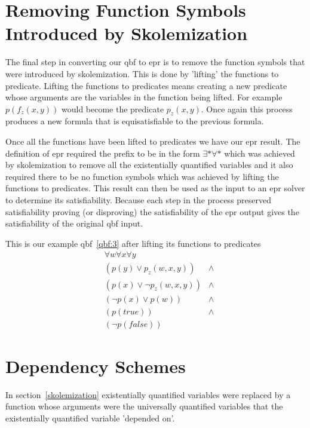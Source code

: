 \section{Removing Function Symbols Introduced by Skolemization}
The final step in converting our \gls{qbf} to \gls{epr} is to remove the function symbols that were introduced by skolemization. This is done by 'lifting' the functions to predicate. Lifting the functions to predicates means creating a new predicate whose arguments are the variables in the function being lifted. For example $p(f_z(x, y))$ would become the predicate $p_z(x, y)$. Once again this process produces a new formula that is equisatisfiable to the previous formula.

Once all the functions have been lifted to predicates we have our \gls{epr} result. The definition of \gls{epr} required the prefix to be in the form $\exists * \forall *$ which was achieved by skolemization to remove all the existentially quantified variables and it also required there to be no function symbols which was achieved by lifting the functions to predicates. This result can then be used as the input to an \gls{epr} solver to determine its satisfiability. Because each step in the process preserved satisfiability proving (or disproving) the satisfiability of the \gls{epr} output gives the satisfiability of the original \gls{qbf} input.

This is our example \gls{qbf}~\ref{qbf:3} after lifting its functions to predicates
\begin{equation} \label{qbf:3}
\begin{aligned}
&\forall w \forall x \forall y\\
&(p(y) \lor p_z(w, x, y)) &\land\\
&(p(x) \lor \neg p_z(w, x, y)) &\land\\
&(\neg p(x) \lor p(w)) &\land\\
&(p(true)) &\land\\
&(\neg p(false))
\end{aligned}
\end{equation}

\section{Dependency Schemes} \label{dependencyschemes}
In section~\ref{skolemization} existentially quantified variables were replaced by a function whose arguments were the universally quantified variables that the existentially quantified variable 'depended on'. 
